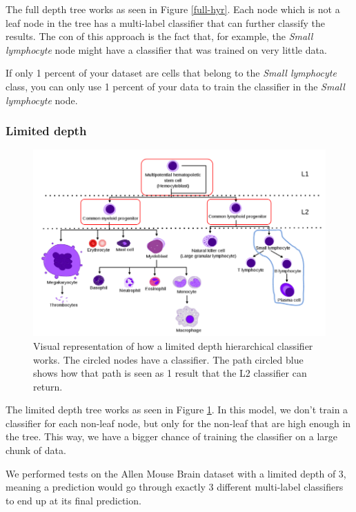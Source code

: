 \documentclass{article}
\begin{document}
The full depth tree works as seen in Figure \ref{full-hyr}. Each node which is not a leaf node in the tree has a multi-label classifier that can further classify the results. The con of this approach is the fact that, for example, the \textit{Small lymphocyte} node might have a classifier that was trained on very little data. 

If only 1 percent of your dataset are cells that belong to the \textit{Small lymphocyte} class, you can only use 1 percent of your data to train the classifier in the \textit{Small lymphocyte} node.

\subsubsection{Limited depth}
\begin{figure}[ht]
\vskip 0.2in
\begin{center}
\centerline{\includegraphics[width=\columnwidth]{images/partial-hyr.png}}
\caption{Visual representation of how a limited depth hierarchical classifier works. The circled nodes have a classifier. The path circled blue shows how that path is seen as 1 result that the L2 classifier can return.}
\label{limited-hyr}
\end{center}
\vskip -0.2in
\end{figure}

The limited depth tree works as seen in Figure \ref{limited-hyr}. In this model, we don't train a classifier for each non-leaf node, but only for the non-leaf that are high enough in the tree. This way, we have a bigger chance of training the classifier on a large chunk of data. 

We performed tests on the Allen Mouse Brain dataset with a limited depth of 3, meaning a prediction would go through exactly 3 different multi-label classifiers to end up at its final prediction.
\end{document}
